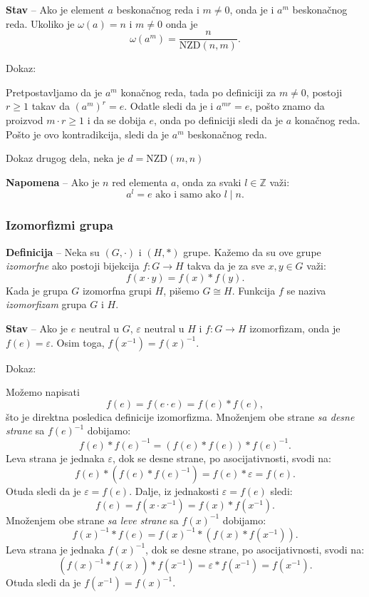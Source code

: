 \documentclass[a4paper,12pt]{article}
\newcommand{\f}[1]{\(#1\)}
\begin{document}
\medskip
\textbf{Stav} -- Ako je element \( a \) beskonačnog reda i \( m \neq 0 \), onda je i \( a^{m} \) beskonačnog reda. 
Ukoliko je \( \omega(a) = n \) i \( m \neq 0 \) onda je 
\[ 
  \omega(a^m) = \frac{n}{\text{NZD}(n, m)}.
\]

Dokaz:
 
Pretpostavljamo da je \( a^m \) konačnog reda, tada po definiciji za \( m \neq 0 \), postoji \( r \geq 1 \) takav da 
\( (a^m)^r = e \). Odatle sledi da je i \( a^{mr} = e \), pošto znamo da proizvod \(m\cdot r \geq 1\) i da se dobija \( e \), onda po definiciji sledi da je
\( a \) konačnog reda. Pošto je ovo kontradikcija, sledi da je \( a^m \) beskonačnog reda.

Dokaz drugog dela, neka je \( d = \text{NZD}(m, n) \)

\textbf{Napomena} -- Ako je \( n \) red elementa \( a \), onda za svaki \( l \in \mathbb{Z} \) važi:
\[
  a^l = e \text{ ako i samo ako } l \mid n.
\]

\subsubsection{Izomorfizmi grupa}

\textbf{Definicija} -- Neka su $(G, \cdot)$ i $(H, *)$ grupe. Kažemo da su ove grupe \emph{izomorfne} ako postoji bijekcija \( f : G \rightarrow H \) takva da je za sve \( x, y \in G \) važi:
\[
  f(x \cdot y) = f(x) * f(y).
\]
Kada je grupa \( G \) izomorfna grupi \( H \), pišemo \( G \cong H \). Funkcija \( f \) se naziva \emph{izomorfizam} grupa \( G \) i \( H \).

\textbf{Stav} -- Ako je \f{e} neutral u \f{G}, \f{\varepsilon} neutral u \f{H} i
\f{f:G \to H} izomorfizam, onda je \f{f(e)=\varepsilon}.
Osim toga, \f{f(x^{-1}) = f(x)^{-1}}.

Dokaz:

Možemo napisati
\[
f(e) = f(e \cdot e) = f(e) * f(e),
\]
što je direktna posledica definicije izomorfizma.
Množenjem obe strane \emph{sa desne strane} sa \f{f(e)^{-1}} dobijamo:
\[
f(e) * f(e)^{-1} = (f(e) * f(e)) * f(e)^{-1}.
\]
Leva strana je jednaka \f{\varepsilon}, dok se desne strane,
po asocijativnosti, svodi na:
\[
f(e) * (f(e) * f(e)^{-1}) = f(e) * \varepsilon = f(e).
\]
Otuda sledi da je \f{\varepsilon = f(e)}.
Dalje, iz jednakosti \f{\varepsilon = f(e)} sledi:
\[ 
f(e) = f(x \cdot x^{-1}) = f(x) * f(x^{-1}).
\]
Množenjem obe strane \emph{sa leve strane} sa \f{f(x)^{-1}} dobijamo:
\[
f(x)^{-1} * f(e) = f(x)^{-1} * (f(x) * f(x^{-1})).
\]
Leva strana je jednaka \f{f(x)^{-1}}, dok se desne strane, po asocijativnosti, svodi na:
\[
(f(x)^{-1} * f(x)) * f(x^{-1}) = \varepsilon * f(x^{-1}) = f(x^{-1}).
\]
Otuda sledi da je \f{f(x^{-1}) = f(x)^{-1}}.
\end{document}
